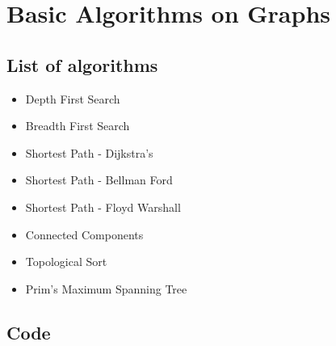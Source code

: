 \section{Basic Algorithms on Graphs}


\subsection{List of algorithms}

\begin{itemize}
  \item Depth First Search
  \item Breadth First Search
  \item Shortest Path - Dijkstra's
  \item Shortest Path - Bellman Ford
  \item Shortest Path - Floyd Warshall
  \item Connected Components
  \item Topological Sort
  \item Prim's Maximum Spanning Tree

\end{itemize}


\subsection{Code}

